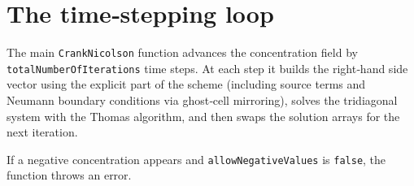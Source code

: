 \documentclass[
  letterpaper,
  DIV=11,
  numbers=noendperiod]{scrreprt}
\begin{document}
\section{The time‑stepping loop}\label{the-timestepping-loop}

The main \texttt{CrankNicolson} function advances the concentration
field by \texttt{totalNumberOfIterations} time steps. At each step it
builds the right‑hand side vector using the explicit part of the scheme
(including source terms and Neumann boundary conditions via ghost‑cell
mirroring), solves the tridiagonal system with the Thomas algorithm, and
then swaps the solution arrays for the next iteration.

If a negative concentration appears and \texttt{allowNegativeValues} is
\texttt{false}, the function throws an error.
\end{document}
